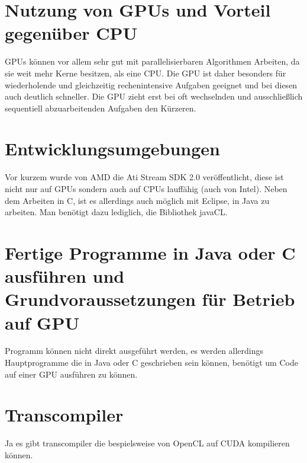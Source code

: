 \documentclass[a4paper,12pt]{scrreprt}
\begin{document}
	\section{Nutzung von GPUs und Vorteil gegenüber CPU}
		GPUs können vor allem sehr gut mit parallelisierbaren Algorithmen Arbeiten, da sie weit mehr Kerne besitzen, als eine CPU. Die GPU ist daher besonders für wiederholende und gleichzeitig rechenintensive Aufgaben geeignet und bei diesen auch deutlich schneller. Die GPU zieht erst bei oft wechselnden und ausschließlich sequentiell abzuarbeitenden Aufgaben den Kürzeren.
	\section{Entwicklungsumgebungen}
		Vor kurzem wurde von AMD die Ati Stream SDK 2.0 veröffentlicht, diese ist nicht nur auf GPUs sondern auch auf CPUs lauffähig (auch von Intel). Neben dem Arbeiten in C, ist es allerdings auch möglich mit Eclipse, in Java zu arbeiten. Man benötigt dazu lediglich, die Bibliothek javaCL. 
		
	\section{Fertige Programme in Java oder C ausführen und Grundvoraussetzungen für Betrieb auf GPU}
		Programm können nicht direkt ausgeführt werden, es werden allerdings Hauptprogramme die in Java oder C geschrieben sein können, benötigt um Code auf einer GPU ausführen zu können.
	\section{Transcompiler}
		Ja es gibt transcompiler die bespielsweise von OpenCL auf CUDA kompilieren können.
		
\end{document}

